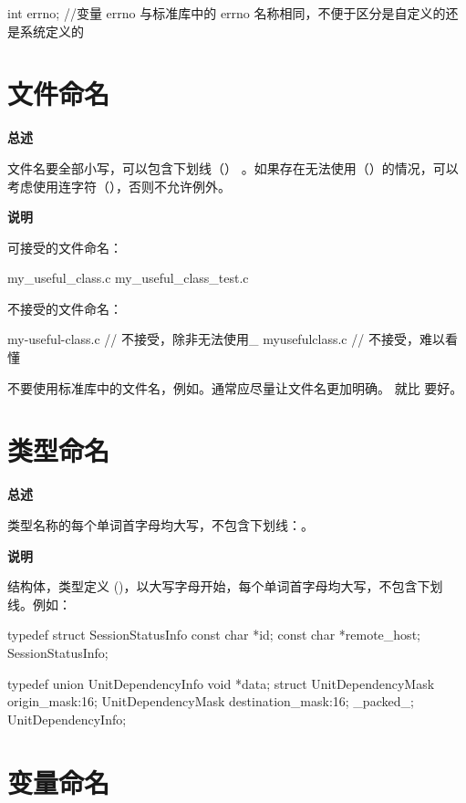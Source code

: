 \begin{ccode}
int errno;  //变量 errno 与标准库中的 errno 名称相同，不便于区分是自定义的还是系统定义的
\end{ccode}

\section{文件命名}

\textbf{总述}

文件名要全部小写，可以包含下划线（\cinline{_}） 。如果存在无法使用（\cinline{_}）的情况，可以考虑使用连字符（\cinline{-}），否则不允许例外。

\textbf{说明}

可接受的文件命名：

\begin{ccode}
my_useful_class.c
my_useful_class_test.c
\end{ccode}

不接受的文件命名：

\begin{ccode}
my-useful-class.c  // 不接受，除非无法使用_
myusefulclass.c    // 不接受，难以看懂
\end{ccode}

不要使用标准库中的文件名，例如。通常应尽量让文件名更加明确。 就比  要好。

\section{类型命名} \label{c-type-names}

\textbf{总述}

类型名称的每个单词首字母均大写，不包含下划线：。

\textbf{说明}

结构体，类型定义 ()，以大写字母开始，每个单词首字母均大写，不包含下划线。例如：

\begin{ccode}
typedef struct SessionStatusInfo {
    const char *id;
    const char *remote_host;
} SessionStatusInfo;

typedef union UnitDependencyInfo {
    void *data;
    struct {
        UnitDependencyMask origin_mask:16;
        UnitDependencyMask destination_mask:16;
    } _packed_;
} UnitDependencyInfo;
\end{ccode}

\section{变量命名} \label{c-variable-names}

